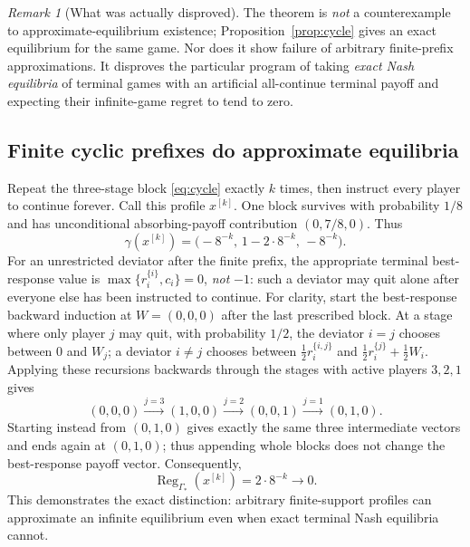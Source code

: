 \documentclass[11pt,a4paper]{article}
\numberwithin{equation}{section}
\theoremstyle{plain}
\theoremstyle{definition}
\theoremstyle{remark}
\newtheorem{remark}[theorem]{Remark}
\newcommand{\Reg}{\operatorname{Reg}}
\begin{document}
\begin{remark}[What was actually disproved]
The theorem is \emph{not} a counterexample to approximate-equilibrium
existence; Proposition~\ref{prop:cycle} gives an exact equilibrium for
the same game. Nor does it show failure of arbitrary finite-prefix
approximations. It disproves the particular program of taking
\emph{exact Nash equilibria} of terminal games with an artificial
all-continue terminal payoff and expecting their infinite-game regret
to tend to zero.
\end{remark}

\subsection{Finite cyclic prefixes do approximate equilibria}
Repeat the three-stage block \eqref{eq:cycle} exactly $k$ times,
then instruct every player to continue forever. Call this profile
$x^{[k]}$. One block survives with probability $1/8$ and has
unconditional absorbing-payoff contribution $(0,7/8,0)$. Thus
\begin{equation}\label{eq:prefix-payoff}
 \gamma(x^{[k]})=
 \bigl(-8^{-k},\,1-2\cdot8^{-k},\,-8^{-k}\bigr).
\end{equation}
For an unrestricted deviator after the finite prefix, the appropriate
terminal best-response value is
$\max\{r_i^{\{i\}},c_i\}=0$, \emph{not} $-1$: such a deviator may
quit alone after everyone else has been instructed to continue.
For clarity, start the best-response backward induction at
$W=(0,0,0)$ after the last prescribed block. At a stage where only
player $j$ may quit, with probability $1/2$, the deviator $i=j$
chooses between $0$ and $W_j$; a deviator $i\ne j$ chooses between
$\tfrac12 r_i^{\{i,j\}}$ and
$\tfrac12 r_i^{\{j\}}+\tfrac12 W_i$.
Applying these recursions backwards through the stages with active
players $3,2,1$ gives
\[
 (0,0,0)\xrightarrow{j=3}(1,0,0)
 \xrightarrow{j=2}(0,0,1)
 \xrightarrow{j=1}(0,1,0).
\]
Starting instead from $(0,1,0)$ gives exactly the same three
intermediate vectors and ends again at $(0,1,0)$; thus appending
whole blocks does not change the best-response payoff vector.
Consequently,
\begin{equation}\label{eq:prefix-reg}
 \Reg_{\Gamma_*}(x^{[k]})=2\cdot8^{-k}\longrightarrow0.
\end{equation}
This demonstrates the exact distinction: arbitrary finite-support
profiles can approximate an infinite equilibrium even when exact
terminal Nash equilibria cannot.
\end{document}
